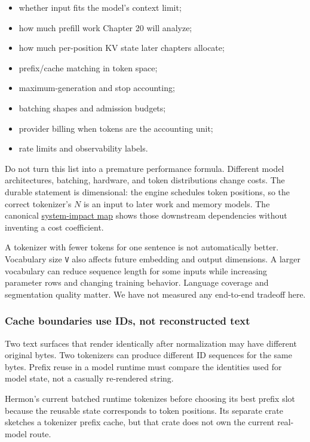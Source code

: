 \documentclass[
  10pt,
]{article}
\providecommand{\tightlist}{%
  \setlength{\itemsep}{0pt}\setlength{\parskip}{0pt}}
\begin{document}
\begin{itemize}
\tightlist
\item
  whether input fits the model's context limit;
\item
  how much prefill work Chapter 20 will analyze;
\item
  how much per-position KV state later chapters allocate;
\item
  prefix/cache matching in token space;
\item
  maximum-generation and stop accounting;
\item
  batching shapes and admission budgets;
\item
  provider billing when tokens are the accounting unit;
\item
  rate limits and observability labels.
\end{itemize}

Do not turn this list into a premature performance formula. Different
model architectures, batching, hardware, and token distributions change
costs. The durable statement is dimensional: the engine schedules token
positions, so the correct tokenizer's \(N\) is an input to later work
and memory models. The canonical
\href{https://github.com/hermonai/inside-the-llm-engine/blob/astra-visual-rewrite/diagrams/tokenizer/token-count-system-impact.txt}{system-impact
map} shows those downstream dependencies without inventing a cost
coefficient.

A tokenizer with fewer tokens for one sentence is not automatically
better. Vocabulary size \texttt{V} also affects future embedding and
output dimensions. A larger vocabulary can reduce sequence length for
some inputs while increasing parameter rows and changing training
behavior. Language coverage and segmentation quality matter. We have not
measured any end-to-end tradeoff here.

\subsubsection{Cache boundaries use IDs, not reconstructed
text}\label{cache-boundaries-use-ids-not-reconstructed-text}

Two text surfaces that render identically after normalization may have
different original bytes. Two tokenizers can produce different ID
sequences for the same bytes. Prefix reuse in a model runtime must
compare the identities used for model state, not a casually re-rendered
string.

Hermon's current batched runtime tokenizes before choosing its best
prefix slot because the reusable state corresponds to token positions.
Its separate \texttt{} crate sketches a
tokenizer prefix cache, but that crate does not own the current
real-model route.
\end{document}
